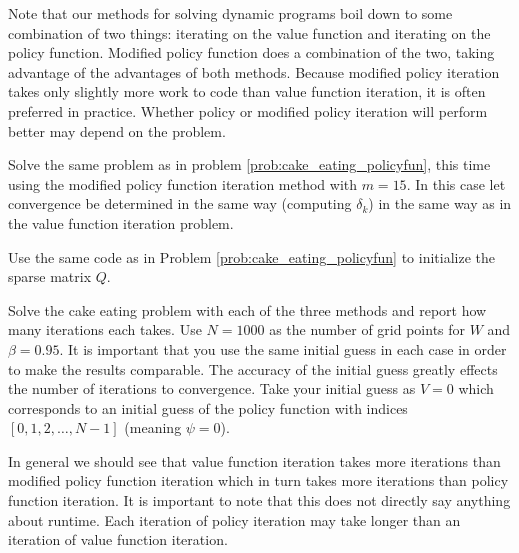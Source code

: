Note that our methods for solving dynamic programs boil down to some combination of two things: iterating on the value function and iterating on the policy function.  Modified policy function does a combination of the two, taking advantage of the advantages of both methods.  Because modified policy iteration takes only slightly more work to code than value function iteration, it is often preferred in practice.  Whether policy or modified policy iteration will perform better may depend on the problem.

\begin{problem}
Solve the same problem as in problem \ref{prob:cake_eating_policyfun}, this time using the modified policy function iteration method with $m=15$.  In this case let convergence be determined in the same way (computing $\delta_k$) in the same way as in the value function iteration problem.

Use the same code as in Problem \ref{prob:cake_eating_policyfun} to initialize the sparse matrix $Q$.
\end{problem}

\begin{problem}
Solve the cake eating problem with each of the three methods and report how many iterations each takes.  Use $N= 1000$ as the number of grid points for $W$ and $\beta = 0.95$.  It is important that you use the same initial guess in each case in order to make the results comparable.  The accuracy of the initial guess greatly effects the number of iterations to convergence.  Take your initial guess as $V = 0$ which corresponds to an initial guess of the policy function with indices $[0,1,2,\ldots, N-1]$ (meaning $\psi = 0$).
\end{problem}

In general we should see that value function iteration takes more iterations than modified policy function iteration which in turn takes more iterations than policy function iteration.  It is important to note that this does not directly say anything about runtime.  Each iteration of policy iteration may take longer than an iteration of value function iteration.

